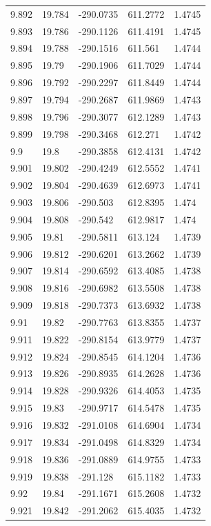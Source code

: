 \begin{tabular}{lllll}
9.892 & 19.784 & -290.0735 & 611.2772 & 1.4745 \\
9.893 & 19.786 & -290.1126 & 611.4191 & 1.4745 \\
9.894 & 19.788 & -290.1516 & 611.561 & 1.4744 \\
9.895 & 19.79 & -290.1906 & 611.7029 & 1.4744 \\
9.896 & 19.792 & -290.2297 & 611.8449 & 1.4744 \\
9.897 & 19.794 & -290.2687 & 611.9869 & 1.4743 \\
9.898 & 19.796 & -290.3077 & 612.1289 & 1.4743 \\
9.899 & 19.798 & -290.3468 & 612.271 & 1.4742 \\
9.9 & 19.8 & -290.3858 & 612.4131 & 1.4742 \\
9.901 & 19.802 & -290.4249 & 612.5552 & 1.4741 \\
9.902 & 19.804 & -290.4639 & 612.6973 & 1.4741 \\
9.903 & 19.806 & -290.503 & 612.8395 & 1.474 \\
9.904 & 19.808 & -290.542 & 612.9817 & 1.474 \\
9.905 & 19.81 & -290.5811 & 613.124 & 1.4739 \\
9.906 & 19.812 & -290.6201 & 613.2662 & 1.4739 \\
9.907 & 19.814 & -290.6592 & 613.4085 & 1.4738 \\
9.908 & 19.816 & -290.6982 & 613.5508 & 1.4738 \\
9.909 & 19.818 & -290.7373 & 613.6932 & 1.4738 \\
9.91 & 19.82 & -290.7763 & 613.8355 & 1.4737 \\
9.911 & 19.822 & -290.8154 & 613.9779 & 1.4737 \\
9.912 & 19.824 & -290.8545 & 614.1204 & 1.4736 \\
9.913 & 19.826 & -290.8935 & 614.2628 & 1.4736 \\
9.914 & 19.828 & -290.9326 & 614.4053 & 1.4735 \\
9.915 & 19.83 & -290.9717 & 614.5478 & 1.4735 \\
9.916 & 19.832 & -291.0108 & 614.6904 & 1.4734 \\
9.917 & 19.834 & -291.0498 & 614.8329 & 1.4734 \\
9.918 & 19.836 & -291.0889 & 614.9755 & 1.4733 \\
9.919 & 19.838 & -291.128 & 615.1182 & 1.4733 \\
9.92 & 19.84 & -291.1671 & 615.2608 & 1.4732 \\
9.921 & 19.842 & -291.2062 & 615.4035 & 1.4732 \\

\end{tabular}

